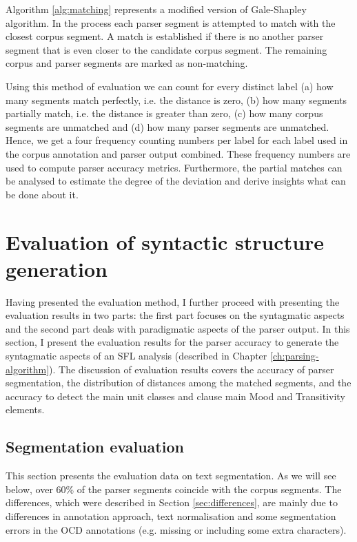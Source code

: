     Algorithm \ref{alg:matching} represents a modified version of Gale-Shapley algorithm. In the process each parser segment is attempted to match with the closest corpus segment. A match is established if there is no another parser segment that is even closer to the candidate corpus segment. The remaining corpus and parser segments are marked as non-matching.

    Using this method of evaluation we can count for every distinct label (a) how many segments match perfectly, i.e. the distance is zero, (b) how many segments partially match, i.e. the distance is greater than zero, (c) how many corpus segments are unmatched and (d) how many parser segments are unmatched. Hence, we get a four frequency counting numbers per label for each label used in the corpus annotation and parser output combined. These frequency numbers are used to compute parser accuracy metrics. Furthermore, the partial matches can be analysed to estimate the degree of the deviation and derive insights what can be done about it.  

\section{Evaluation of syntactic structure generation}
\label{sec:syntactic-evaluation}
    
    Having presented the evaluation method, I further proceed with presenting the evaluation results in two parts: the first part focuses on the syntagmatic aspects and the second part deals with paradigmatic aspects of the parser output. In this section, I present the evaluation results for the parser accuracy to generate the syntagmatic aspects of an SFL analysis (described in Chapter \ref{ch:parsing-algorithm}). The discussion of evaluation results covers the accuracy of parser segmentation, the distribution of distances among the matched segments, and the accuracy to detect the main unit classes and clause main Mood and Transitivity elements. 
    
\subsection{Segmentation evaluation}
\label{sec:segmentation-evaluation}
    
    This section presents the evaluation data on text segmentation. As we will see below, over 60\% of the parser segments coincide with the corpus segments. The differences, which were described in Section \ref{sec:differences}, are mainly due to differences in annotation approach, text normalisation and some segmentation errors in the OCD annotations (e.g. missing or including some extra characters). 
    
